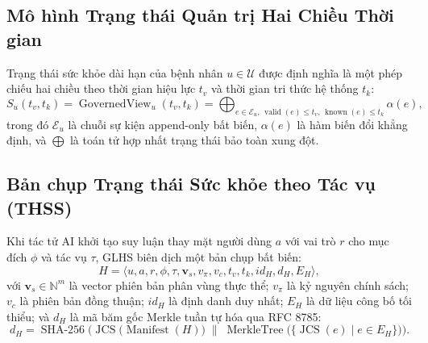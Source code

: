 \documentclass[11pt,a4paper]{article}
\begin{document}
\subsection{Mô hình Trạng thái Quản trị Hai Chiều Thời gian}
Trạng thái sức khỏe dài hạn của bệnh nhân $u \in \mathcal{U}$ được định nghĩa là một phép chiếu hai chiều theo thời gian hiệu lực $t_v$ và thời gian tri thức hệ thống $t_k$:
\begin{equation}
S_u(t_v, t_k) = \operatorname{GovernedView}_u(t_v, t_k) = \bigoplus_{e \in \mathcal{E}_u, \, \operatorname{valid}(e) \le t_v, \, \operatorname{known}(e) \le t_k} \alpha(e),
\label{eq:state_bitemporal_vi}
\end{equation}
trong đó $\mathcal{E}_u$ là chuỗi sự kiện append-only bất biến, $\alpha(e)$ là hàm biến đổi khẳng định, và $\bigoplus$ là toán tử hợp nhất trạng thái bảo toàn xung đột.

\subsection{Bản chụp Trạng thái Sức khỏe theo Tác vụ (THSS)}
Khi tác tử AI khởi tạo suy luận thay mặt người dùng $a$ với vai trò $r$ cho mục đích $\phi$ và tác vụ $\tau$, GLHS biên dịch một bản chụp bất biến:
\begin{equation}
H = \langle u, a, r, \phi, \tau, \mathbf{v}_s, v_{\pi}, v_c, t_v, t_k, id_H, d_H, E_H \rangle,
\label{eq:thss_definition_vi}
\end{equation}
với $\mathbf{v}_s \in \mathbb{N}^m$ là vector phiên bản phân vùng thực thể; $v_{\pi}$ là kỷ nguyên chính sách; $v_c$ là phiên bản đồng thuận; $id_H$ là định danh duy nhất; $E_H$ là dữ liệu công bố tối thiểu; và $d_H$ là mã băm gốc Merkle tuần tự hóa qua RFC 8785:
\begin{equation}
d_H = \operatorname{SHA-256}\Big(\operatorname{JCS}\big(\operatorname{Manifest}(H)\big) \;\parallel\; \operatorname{MerkleTree}\big(\{ \operatorname{JCS}(e) \mid e \in E_H \}\big)\Big).
\label{eq:digest_merkle_vi}
\end{equation}
\end{document}
